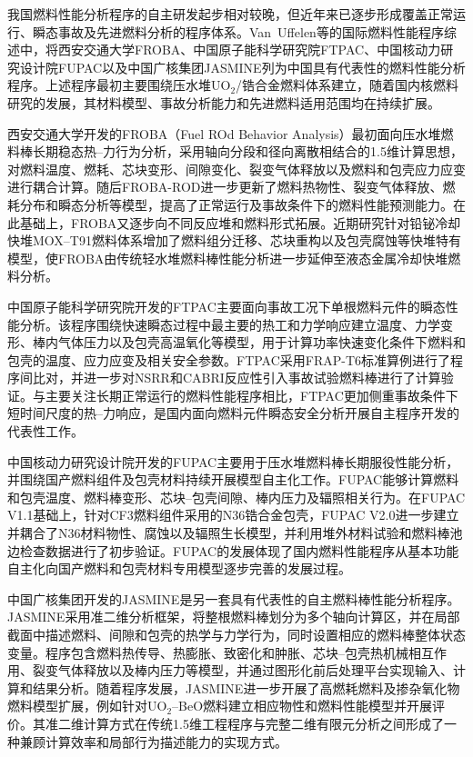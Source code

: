我国燃料性能分析程序的自主研发起步相对较晚，但近年来已逐步形成覆盖正常运行、瞬态事故及先进燃料分析的程序体系。Van~Uffelen等\cite{vanuffelenReviewFuelPerformance2019}的国际燃料性能程序综述中，将西安交通大学FROBA、中国原子能科学研究院FTPAC、中国核动力研究设计院FUPAC以及中国广核集团JASMINE列为中国具有代表性的燃料性能分析程序。上述程序最初主要围绕压水堆UO$_2$/锆合金燃料体系建立，随着国内核燃料研究的发展，其材料模型、事故分析能力和先进燃料适用范围均在持续扩展。

西安交通大学开发的FROBA（Fuel ROd Behavior Analysis）最初面向压水堆燃料棒长期稳态热--力行为分析，采用轴向分段和径向离散相结合的1.5维计算思想，对燃料温度、燃耗、芯块变形、间隙变化、裂变气体释放以及燃料和包壳应力应变进行耦合计算\cite{yuDevelopmentFuelROd2012}。随后FROBA-ROD进一步更新了燃料热物性、裂变气体释放、燃耗分布和瞬态分析等模型，提高了正常运行及事故条件下的燃料性能预测能力\cite{liaoModificationUpdateFROBA2019}。在此基础上，FROBA又逐步向不同反应堆和燃料形式拓展。近期研究针对铅铋冷却快堆MOX--T91燃料体系增加了燃料组分迁移、芯块重构以及包壳腐蚀等快堆特有模型，使FROBA由传统轻水堆燃料棒性能分析进一步延伸至液态金属冷却快堆燃料分析\cite{dengUpgradeFROBACode2026}。

中国原子能科学研究院开发的FTPAC主要面向事故工况下单根燃料元件的瞬态性能分析。该程序围绕快速瞬态过程中最主要的热工和力学响应建立温度、力学变形、棒内气体压力以及包壳高温氧化等模型，用于计算功率快速变化条件下燃料和包壳的温度、应力应变及相关安全参数\cite{hanValidationApplicationFTPAC2014}。FTPAC采用FRAP-T6标准算例进行了程序间比对，并进一步对NSRR和CABRI反应性引入事故试验燃料棒进行了计算验证。与主要关注长期正常运行的燃料性能程序相比，FTPAC更加侧重事故条件下短时间尺度的热--力响应，是国内面向燃料元件瞬态安全分析开展自主程序开发的代表性工作。

中国核动力研究设计院开发的FUPAC主要用于压水堆燃料棒长期服役性能分析，并围绕国产燃料组件及包壳材料持续开展模型自主化工作。FUPAC能够计算燃料和包壳温度、燃料棒变形、芯块--包壳间隙、棒内压力及辐照相关行为。在FUPAC V1.1基础上，针对CF3燃料组件采用的N36锆合金包壳，FUPAC V2.0进一步建立并耦合了N36材料物性、腐蚀以及辐照生长模型，并利用堆外材料试验和燃料棒池边检查数据进行了初步验证\cite{xingFuelRodAnalysis2021}。FUPAC的发展体现了国内燃料性能程序从基本功能自主化向国产燃料和包壳材料专用模型逐步完善的发展过程。

中国广核集团开发的JASMINE是另一套具有代表性的自主燃料棒性能分析程序。JASMINE采用准二维分析框架，将整根燃料棒划分为多个轴向计算区，并在局部截面中描述燃料、间隙和包壳的热学与力学行为，同时设置相应的燃料棒整体状态变量\cite{weiModelingFuelRodJASMINE2017}。程序包含燃料热传导、热膨胀、致密化和肿胀、芯块--包壳热机械相互作用、裂变气体释放以及棒内压力等模型，并通过图形化前后处理平台实现输入、计算和结果分析。随着程序发展，JASMINE进一步开展了高燃耗燃料及掺杂氧化物燃料模型扩展，例如针对UO$_2$--BeO燃料建立相应物性和燃料性能模型并开展评价\cite{wangAnalysisAssessmentBeO2024}。其准二维计算方式在传统1.5维工程程序与完整二维有限元分析之间形成了一种兼顾计算效率和局部行为描述能力的实现方式。

